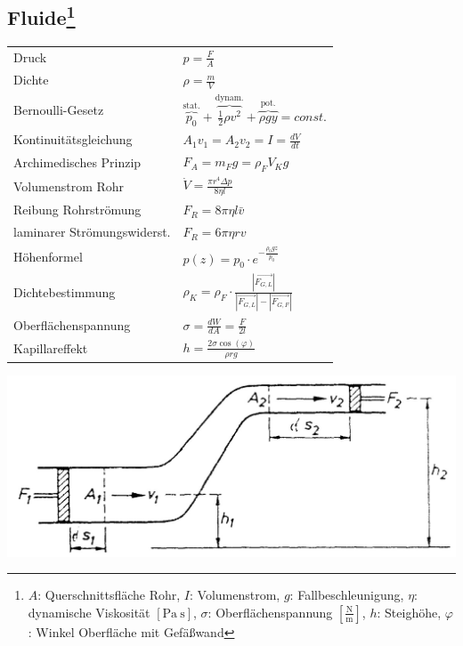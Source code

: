\documentclass[12pt,a4paper]{article}
\renewcommand{\=}[1]{\stackrel{#1}{=}}
\theoremstyle{definition}
\theoremstyle{remark}
\begin{document}
\subsection[Fluide]{Fluide\let\thefootnote\relax\footnote{$A$: Querschnittsfläche Rohr, $I$: Volumenstrom, $g$: Fallbeschleunigung, $\eta$: dynamische Viskosität $[\text{Pa}~\text{s}]$, $\sigma$: Oberflächenspannung $[\frac{\text{N}}{\text{m}}]$, $h$: Steighöhe, $\varphi$: Winkel Oberfläche mit Gefäßwand}}

\begin{center}
\begin{minipage}[t]{.6\linewidth}
\vspace{0pt}
\begin{tabular}{ll}
Druck & $p = \frac{F}{A}$\\
Dichte & $\rho = \frac{m}{V}$\\
Bernoulli-Gesetz & $\overbrace{p_0}^\textrm{stat.} + \overbrace{\frac{1}{2}\rho v^2}^\textrm{dynam.} + \overbrace{\rho g y}^\textrm{pot.} = const.$\\
Kontinuitätsgleichung & $A_1 v_1 = A_2 v_2 = I = \frac{dV}{dt}$\\
Archimedisches Prinzip & $F_A = m_F g = \rho_F V_K g$\\
Volumenstrom Rohr & $\dot{V} = \frac{\pi r^4 \Delta p}{8 \eta l}$\\
Reibung Rohrströmung & $F_R = 8\pi\eta l \bar{v}$\\
laminarer Strömungswiderst. & $F_R = 6 \pi \eta r v$\\
Höhenformel & $p(z) = p_0 \cdot e^{-\frac{\rho_0 g z}{p_0}}$\\
Dichtebestimmung & $\rho_K = \rho_{F} \cdot \frac{|\vec{F_{G,L}}|}{|\vec{F_{G,L}}|-|\vec{F_{G,F}}|}$\\
Oberflächenspannung & $\sigma = \frac{dW}{dA} = \frac{F}{2l}$\\
Kapillareffekt & $h = \frac{2 \sigma \cos(\varphi)}{\rho r g}$\\
\end{tabular}
\end{minipage}%
\begin{minipage}[t]{.4\linewidth}
\vspace{0pt}
\centering
\includegraphics[width=\linewidth]{pic/bernoulli.png}

\end{minipage}
\end{center}
\end{document}
